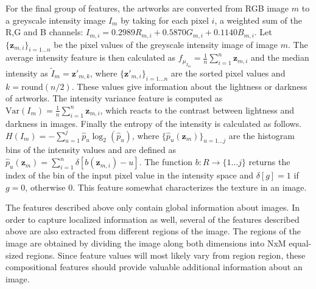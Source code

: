 
For the final group of features, the artworks are converted from RGB image $m$ to a greyscale intensity image $I_m$ by taking for each pixel $i$, a weighted sum of the R,G and B channels: $I_{m,i} = 0.2989R_{m,i} + 0.5870G_{m,i} + 0.1140B_{m,i} $. Let $\{\mathbf{z}_{m,i}\}_{i=1\dots n}$ be the pixel values of the greyscale intensity image of image $m$. The average intensity feature is then calculated as $f_{\mu_{I_m}} = \frac{1}{n} \sum_{i = 1}^{n} \mathbf{z}_{m,i}$ and the median intensity as $\tilde{I}_m = \mathbf{z'}_{m,k}$, where $\{\mathbf{z'}_{m,i}\}_{i = 1\dots n}$ are the sorted pixel values and $k = \mbox{round}(n/2)$. These values give information about the lightness or darkness of artworks. The intensity variance feature is computed as $\mbox{Var}(I_m) = \frac{1}{n} \sum_{i=1}^n \mathbf{z}_{m,i}$, which reacts to the contrast between lightness and darkness in images. Finally the entropy of the intensity is calculated as follows. $H(I_m) = -\sum_{u = 1}^{j} \hat{p}_u \log_2(\hat{p}_u) $, where $\{\hat{p}_u(\mathbf{z}_m)\}_{u = 1 \dots j}$ are the histogram bins of the intensity values and are defined as $\hat{p}_u(\mathbf{z}_m) = \sum_{i=1}^n \delta[b(\mathbf{z}_{m,i}) - u] $. The function $b : R \rightarrow \{1 \dots j \}$ returns the index of the bin of the input pixel value in the intensity space and $\delta[g] = 1$ if $g = 0$, otherwise $0$. This feature somewhat characterizes the texture in an image.  

The features described above only contain global information about images. In order to capture localized information as well, several of the features described above are also extracted from different regions of the image. The regions of the image are obtained by dividing the image along both dimensions into NxM equal-sized regions. Since feature values will most likely vary from region region, these compositional features should provide valuable additional information about an image. 



